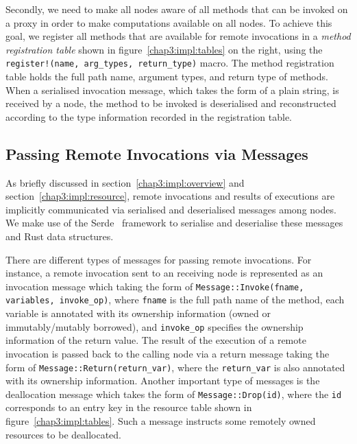 Secondly, we need to make all nodes aware of all methods that can be invoked on a proxy in order to make computations available on all nodes. To achieve this goal, we register all methods that are available for remote invocations in a \emph{method registration table} shown in figure~\ref{chap3:impl:tables} on the right, using the \texttt{register!(name, arg\_types, return\_type)} macro. The method registration table holds the full path name, argument types, and return type of methods. When a serialised invocation message, which takes the form of a plain string, is received by a node, the method to be invoked is deserialised and reconstructed according to the type information recorded in the registration table.

\subsection{Passing Remote Invocations via Messages}
\label{impl:message}
As briefly discussed in section~\ref{chap3:impl:overview} and section~\ref{chap3:impl:resource}, remote invocations and results of executions are implicitly communicated via serialised and deserialised messages among nodes. We make use of the Serde~\citep{serde} framework to serialise and deserialise these messages and Rust data structures.

There are different types of messages for passing remote invocations. For instance, a remote invocation sent to an receiving node is represented as an invocation message which taking the form of \texttt{Message::Invoke(fname, variables, invoke\_op)}, where \texttt{fname} is the full path name of the method, each variable is annotated with its ownership information (owned or immutably/mutably borrowed), and \texttt{invoke\_op} specifies the ownership information of the return value. The result of the execution of a remote invocation is passed back to the calling node via a return message taking the form of \texttt{Message::Return(return\_var)}, where the \texttt{return\_var} is also annotated with its ownership information. Another important type of messages is the deallocation message which takes the form of \texttt{Message::Drop(id)}, where the \texttt{id} corresponds to an entry key in the resource table shown in figure~\ref{chap3:impl:tables}. Such a message instructs some remotely owned resources to be deallocated.

